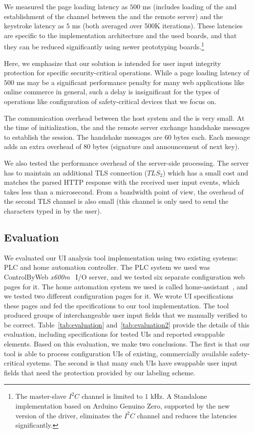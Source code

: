 We measured the page loading latency as $500$ ms (includes loading of the \webusb \js and establishment of the \tls channel between the \device and the remote server) and the keystroke latency as $5$ ms (both averaged over 500K iterations). These latencies are specific to the implementation architecture and the used boards, and that they can be reduced significantly using newer prototyping boards.\footnote{The master-slave $I^2C$ channel is limited to $1$ kHz. A Standalone implementation based on Arduino Genuino Zero, supported by the new version of the \webusb driver, eliminates the $I^2C$ channel and reduces the latencies significantly.} 

Here, we emphasize that our solution is intended for user input integrity protection for specific security-critical operations. While a page loading latency of $500$ ms may be a significant performance penalty for many web applications like online commerce in general, such a delay is insignificant for the types of operations like configuration of safety-critical devices that we focus on.

The communication overhead between the host system and the \device is very small. At the time of initialization, the \device and the remote server exchange \tls handshake messages to establish the session. The handshake messages are $60$ bytes each. Each \tls message adds an extra overhead of $80$ bytes (signature and announcement of next key). 

We also tested the performance overhead of the server-side processing. The server has to maintain an additional TLS connection ($TLS_2$) which has a small cost and matches the parsed HTTP response with the received user input events, which takes less than a microsecond. 
From a bandwidth point of view, the overhead of the second TLS channel is also small (this channel is only used to send the characters typed in by the user).

\subsection{\tool Evaluation} 
\label{sec:results:framework}

We evaluated our UI analysis tool implementation using two existing systems: PLC and home automation controller. The PLC system we used was ControlByWeb \emph{x600m}~\cite{controlbyweb} I/O server, and we tested six separate configuration web pages for it. The home automation system we used is called home-assistant~\cite{ha}, and we tested two different configuration pages for it. We wrote UI specifications these pages and fed the specifications to our tool implementation. The tool produced groups of interchangeable user input fields that we manually verified to be correct. Table~\ref{tab:evaluation} and~\ref{tab:evaluation2} provide the details of this evaluation, including specifications for tested UIs and reported swappable elements. Based on this evaluation, we make two conclusions. The first is that our tool is able to process configuration UIs of existing, commercially available safety-critical systems. The second is that many such UIs have swappable user input fields that need the protection provided by our labeling scheme.

